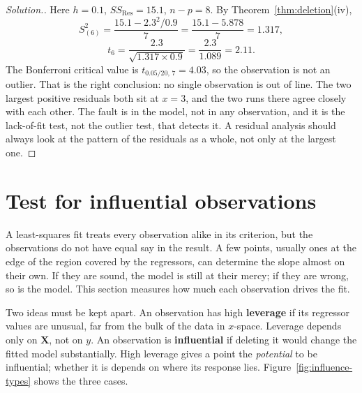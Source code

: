 \documentclass[11pt,a4paper]{article}
\numberwithin{equation}{section}
\theoremstyle{definition}
\newenvironment{solution}
  {\renewcommand{\qedsymbol}{}\begin{proof}[\textit{Solution}.]}
  {\end{proof}}
\begin{document}
\begin{solution}
Here $h = 0.1$, $SS_{\mathrm{Res}} = 15.1$, $n - p = 8$. By Theorem~\ref{thm:deletion}(iv),
\[
S^2_{(6)} = \frac{15.1 - 2.3^2/0.9}{7} = \frac{15.1 - 5.878}{7} = 1.317 ,
\]
\[
t_6 = \frac{2.3}{\sqrt{1.317 \times 0.9}} = \frac{2.3}{1.089} = 2.11 .
\]
The Bonferroni critical value is $t_{0.05/20,\,7} = 4.03$, so the observation is not an
outlier. That is the right conclusion: no single observation is out of line. The two
largest positive residuals both sit at $x = 3$, and the two runs there agree closely with
each other. The fault is in the model, not in any observation, and it is the lack-of-fit
test, not the outlier test, that detects it. A residual analysis should always look at the
pattern of the residuals as a whole, not only at the largest one.
\end{solution}

\section{Test for influential observations}
A least-squares fit treats every observation alike in its criterion, but the observations
do not have equal say in the result. A few points, usually ones at the edge of the region
covered by the regressors, can determine the slope almost on their own. If they are sound,
the model is still at their mercy; if they are wrong, so is the model. This section
measures how much each observation drives the fit.

Two ideas must be kept apart. An observation has high \textbf{leverage} if its regressor
values are unusual, far from the bulk of the data in $x$-space. Leverage depends only on
$\mathbf{X}$, not on $y$. An observation is \textbf{influential} if deleting it would change
the fitted model substantially. High leverage gives a point the \emph{potential} to be
influential; whether it is depends on where its response lies. Figure~\ref{fig:influence-types}
shows the three cases.
\end{document}
